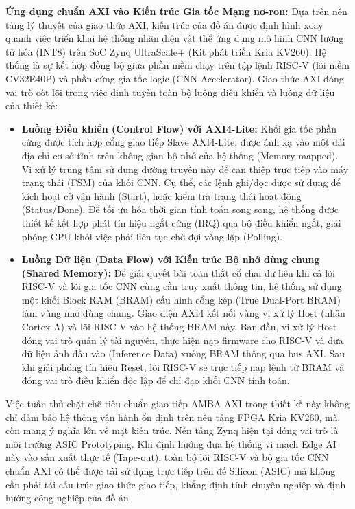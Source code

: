 \textbf{Ứng dụng chuẩn AXI vào Kiến trúc Gia tốc Mạng nơ-ron:}
Dựa trên nền tảng lý thuyết của giao thức AXI, kiến trúc của đồ án được định hình xoay quanh việc triển khai hệ thống nhận diện vật thể ứng dụng mô hình CNN lượng tử hóa (INT8) trên SoC Zynq UltraScale+ (Kit phát triển Kria KV260). Hệ thống là sự kết hợp đồng bộ giữa phần mềm chạy trên tập lệnh RISC-V (lõi mềm CV32E40P) và phần cứng gia tốc logic (CNN Accelerator). Giao thức AXI đóng vai trò cốt lõi trong việc định tuyến toàn bộ luồng điều khiển và luồng dữ liệu của thiết kế:

\begin{itemize}
    \item \textbf{Luồng Điều khiển (Control Flow) với AXI4-Lite:} Khối gia tốc phần cứng được tích hợp cổng giao tiếp Slave AXI4-Lite, được ánh xạ vào một dải địa chỉ cơ sở tĩnh trên không gian bộ nhớ của hệ thống (Memory-mapped). Vi xử lý trung tâm sử dụng đường truyền này để can thiệp trực tiếp vào máy trạng thái (FSM) của khối CNN. Cụ thể, các lệnh ghi/đọc được sử dụng để kích hoạt cờ vận hành (Start), hoặc kiểm tra trạng thái hoạt động (Status/Done). Để tối ưu hóa thời gian tính toán song song, hệ thống được thiết kế kết hợp phát tín hiệu ngắt cứng (IRQ) qua bộ điều khiển ngắt, giải phóng CPU khỏi việc phải liên tục chờ đợi vòng lặp (Polling).
    
    \item \textbf{Luồng Dữ liệu (Data Flow) với Kiến trúc Bộ nhớ dùng chung (Shared Memory):} Để giải quyết bài toán thắt cổ chai dữ liệu khi cả lõi RISC-V và lõi gia tốc CNN cùng cần truy xuất thông tin, hệ thống sử dụng một khối Block RAM (BRAM) cấu hình cổng kép (True Dual-Port BRAM) làm vùng nhớ dùng chung. Giao diện AXI4 kết nối vùng vi xử lý Host (nhân Cortex-A) và lõi RISC-V vào hệ thống BRAM này. Ban đầu, vi xử lý Host đóng vai trò quản lý tài nguyên, thực hiện nạp firmware cho RISC-V và đưa dữ liệu ảnh đầu vào (Inference Data) xuống BRAM thông qua bus AXI. Sau khi giải phóng tín hiệu Reset, lõi RISC-V sẽ trực tiếp nạp lệnh từ BRAM và đóng vai trò điều khiển độc lập để chỉ đạo khối CNN tính toán.
\end{itemize}

Việc tuân thủ chặt chẽ tiêu chuẩn giao tiếp AMBA AXI trong thiết kế này không chỉ đảm bảo hệ thống vận hành ổn định trên nền tảng FPGA Kria KV260, mà còn mang ý nghĩa lớn về mặt kiến trúc. Nền tảng Zynq hiện tại đóng vai trò là môi trường ASIC Prototyping. Khi định hướng đưa hệ thống vi mạch Edge AI này vào sản xuất thực tế (Tape-out), toàn bộ lõi RISC-V và bộ gia tốc CNN chuẩn AXI có thể được tái sử dụng trực tiếp trên đế Silicon (ASIC) mà không cần phải tái cấu trúc giao thức giao tiếp, khẳng định tính chuyên nghiệp và định hướng công nghiệp của đồ án.
%
\newpage
